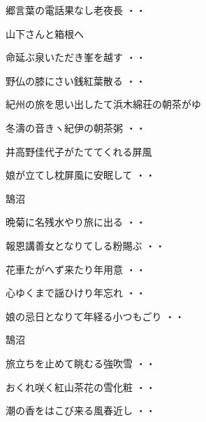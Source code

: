 \begin{shiika}郷言葉の電話果なし老夜長
\hfill{・・}\end{shiika}
\vspace{0.6cm}
山下さんと箱根へ
\begin{shiika}命延ぶ泉いただき峯を越す
\hfill{・・}\end{shiika}
\begin{shiika}野仏の膝にさい銭紅葉散る
\hfill{・・}\end{shiika}
\vspace{0.6cm}
紀州の旅を思い出したて浜木綿荘の朝茶がゆ
\begin{shiika}冬濤の音きヽ紀伊の朝茶粥
\hfill{・・}\end{shiika}
\vspace{0.6cm}
井高野佳代子がたててくれる屏風
\begin{shiika}娘が立てし枕屏風に安眠して
\hfill{・・}\end{shiika}
\vspace{0.6cm}
鵠沼
\begin{shiika}晩菊に名残水やり旅に出る
\hfill{・・}\end{shiika}
\begin{shiika}報恩講善女となりてしる粉賜ぶ
\hfill{・・}\end{shiika}
\begin{shiika}花車たがへず来たり年用意
\hfill{・・}\end{shiika}
\begin{shiika}心ゆくまで謡ひけり年忘れ
\hfill{・・}\end{shiika}
\begin{shiika}娘の忌日となりて年経る小つもごり
\hfill{・・}\end{shiika}
\vspace{0.6cm}
鵠沼
\begin{shiika}旅立ちを止めて眺むる強吹雪
\hfill{・・}\end{shiika}
\begin{shiika}おくれ咲く紅山茶花の雪化粧
\hfill{・・}\end{shiika}
\begin{shiika}潮の香をはこび来る風春近し
\hfill{・・}\end{shiika}
